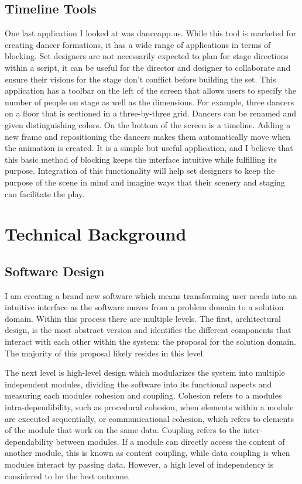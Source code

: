 \documentclass[10pt,twocolumn]{article}
\begin{document}
\subsection{Timeline Tools}
One last application I looked at was danceapp.us. While this tool is marketed for creating dancer formations, it has a wide range of applications in terms of blocking. Set designers are not necessarily expected to plan for stage directions within a script, it can be useful for the director and designer to collaborate and ensure their visions for the stage don't conflict before building the set. This application has a toolbar on the left of the screen that allows users to specify the number of people on stage as well as the dimensions. For example, three dancers on a floor that is sectioned in a three-by-three grid. Dancers can be renamed and given distinguishing colors. On the bottom of the screen is a timeline. Adding a new frame and repositioning the dancers makes them automatically move when the animation is created. It is a simple but useful application, and I believe that this basic method of blocking keeps the interface intuitive while fulfilling its purpose. Integration of this functionality will help set designers to keep the purpose of the scene in mind and imagine ways that their scenery and staging can facilitate the play.  

\section{Technical Background}
\subsection{Software Design}
I am creating a brand new software which means transforming user needs into an intuitive interface as the software moves from a problem domain to a solution domain. Within this process there are multiple levels. The first, architectural design, is the most abstract version and identifies the different components that interact with each other within the system: the proposal for the solution domain. The majority of this proposal likely resides in this level.

The next level is high-level design which modularizes the system into multiple independent modules, dividing the software into its functional aspects and measuring each modules cohesion and coupling. Cohesion refers to a modules intra-dependibility, such as procedural cohesion, when elements within a module are executed sequentially, or communicational cohesion, which refers to elements of the module that work on the same data. Coupling refers to the inter-dependability between modules. If a module can directly access the content of another module, this is known as content coupling, while data coupling is when modules interact by passing data. However, a high level of independency is considered to be the best outcome. 
\end{document}
